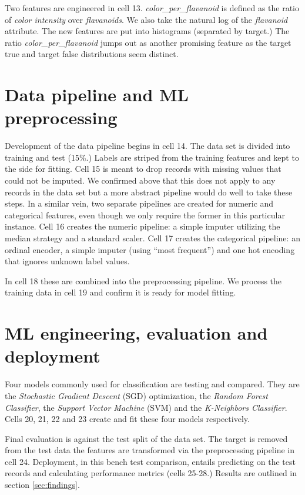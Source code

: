 \documentclass[11pt,letterpaper]{article}
\begin{document}
Two features are engineered in cell 13. \emph{color\_per\_flavanoid} is defined as the ratio of \emph{color intensity} over \emph{flavanoids}. We also take the natural log of the \emph{flavanoid} attribute. The new features are put into histograms (separated by target.) The ratio \emph{color\_per\_flavanoid} jumps out as another promising feature as the target true and target false distributions seem distinct.

\section{Data pipeline and ML preprocessing}
\tab Development of the data pipeline begins in cell 14. The data set is divided into training and test (15\%.) Labels are striped from the training features and kept to the side for fitting. Cell 15 is meant to drop records with missing values that could not be imputed. We confirmed above that this does not apply to any records in the data set but a more abstract pipeline would do well to take these steps. In a similar vein, two separate pipelines are created for numeric and categorical features, even though we only require the former in this particular instance. Cell 16 creates the numeric pipeline: a simple imputer utilizing the median strategy and a standard scaler. Cell 17 creates the categorical pipeline: an ordinal encoder, a simple imputer (using ``most frequent'') and one hot encoding that ignores unknown label values. 

In cell 18 these are combined into the preprocessing pipeline. We process the training data in cell 19 and confirm it is ready for model fitting.

\section{ML engineering, evaluation and deployment}
\tab Four models commonly used for classification are testing and compared. They are the \emph{Stochastic Gradient Descent} (SGD) optimization, the \emph{Random Forest Classifier}, the \emph{Support Vector Machine} (SVM) and the \emph{K-Neighbors Classifier}. Cells 20, 21, 22 and 23 create and fit these four models respectively. 

\clearpage

Final evaluation is against the test split of the data set. The target is removed from the test data the features are transformed via the preprocessing pipeline in cell 24. Deployment, in this bench test comparison, entails predicting on the test records and calculating performance metrics (cells 25-28.) Results are outlined in section \ref{sec:findings}.
\end{document}
